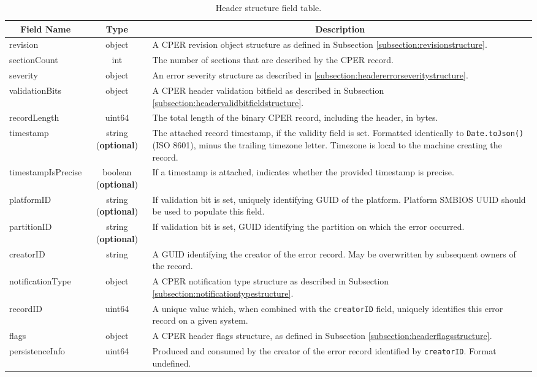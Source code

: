\documentclass{report}
\newcommand*{\thead}[1]{\multicolumn{1}{|c|}{\bfseries #1}}
\newcommand*{\jsontable}[1]{
    \begin{table}[!ht]
    \label{#1}
    \centering
    \begin{adjustbox}{center}
    \begin{tabular}{|l|c|p{8cm}|}
    \hline
    \thead{Field Name} & \thead{Type} & \thead{Description} \\
    \hline
}
\newcommand*{\jsontableend}[1]{
    \hline
    \end{tabular}
    \end{adjustbox}
    \caption{#1}
    \label{table:#1}
    \end{table}
    \FloatBarrier
}
\begin{document}
\jsontable{table:headerstructure}
revision & object & A CPER revision object structure as defined in Subsection \ref{subsection:revisionstructure}. \\
\hline
sectionCount & int & The number of sections that are described by the CPER record.\\
\hline
severity & object & An error severity structure as described in \ref{subsection:headererrorseveritystructure}.\\
\hline
validationBits & object & A CPER header validation bitfield as described in Subsection \ref{subsection:headervalidbitfieldstructure}.\\
\hline
recordLength & uint64 & The total length of the binary CPER record, including the header, in bytes.\\
\hline
timestamp & string (\textbf{optional}) & The attached record timestamp, if the validity field is set. Formatted identically to \texttt{Date.toJson()} (ISO 8601), minus the trailing timezone letter. Timezone is local to the machine creating the record.\\
\hline
timestampIsPrecise & boolean (\textbf{optional}) & If a timestamp is attached, indicates whether the provided timestamp is precise.\\
\hline
platformID & string (\textbf{optional}) & If validation bit is set, uniquely identifying GUID of the platform. Platform SMBIOS UUID should be used to populate this field.\\
\hline
partitionID & string (\textbf{optional}) & If validation bit is set, GUID identifying the partition on which the error occurred.\\
\hline
creatorID & string & A GUID identifying the creator of the error record. May be overwritten by subsequent owners of the record.\\
\hline
notificationType & object & A CPER notification type structure as described in Subsection \ref{subsection:notificationtypestructure}.\\
\hline
recordID & uint64 & A unique value which, when combined with the \texttt{creatorID} field, uniquely identifies this error record on a given system.\\
\hline
flags & object & A CPER header flags structure, as defined in Subsection \ref{subsection:headerflagsstructure}.\\
\hline
persistenceInfo & uint64 & Produced and consumed by the creator of the error record identified by \texttt{creatorID}. Format undefined.\\
\jsontableend{Header structure field table.}
\end{document}
